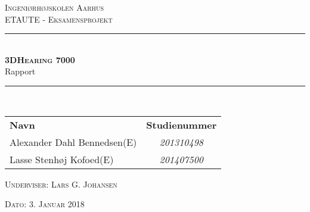 \newcommand{\HRule}{\rule{\linewidth}{0.1mm}} %

\thispagestyle{empty}
\begin{center}
	\textsc{\LARGE Ingeniørhøjskolen Aarhus}\\[1.5cm] %

	
	\textsc{\large ETAUTE - Eksamensprojekt}\\[2.5cm] 
	\HRule \\[0.8cm]
	{\huge \bfseries \textsc{3DHearing 7000}} \\[0.5cm]{\LARGE Rapport} \\[0.4cm]
	\HRule \\[1.5cm]
	
	\vspace{0.5 in}
	\begin{center}
		\begin{tabular}{l c}
			\textbf{Navn} & \textbf{Studienummer} \\
			Alexander Dahl Bennedsen(E) & \textsl{201310498}    \\
			Lasse Stenhøj Kofoed(E) & \textsl{201407500}  \\
			
			
		\end{tabular}
	\end{center}
	\vspace{0.5 in}
	
	\textsc{\large Underviser: Lars G. Johansen}
	\vspace{0.5 in}
	
	\textsc{\large Dato: 3. Januar 2018}\\
	
\end{center} %

\newpage